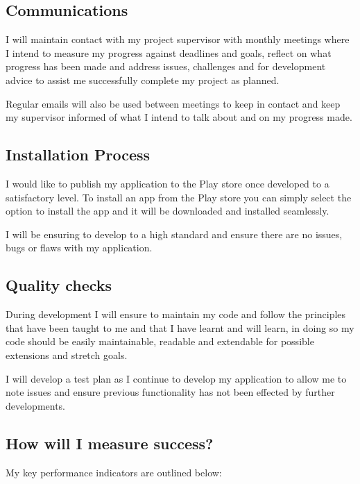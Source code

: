 \subsection{Communications}\label{communications}

I will maintain contact with my project supervisor with monthly meetings
where I intend to measure my progress against deadlines and goals,
reflect on what progress has been made and address issues, challenges
and for development advice to assist me successfully complete my project
as planned.

Regular emails will also be used between meetings to keep in contact and
keep my supervisor informed of what I intend to talk about and on my
progress made.

\subsection{Installation Process}\label{installation-process}

I would like to publish my application to the Play store once developed
to a satisfactory level. To install an app from the Play store you can
simply select the option to install the app and it will be downloaded
and installed seamlessly.

I will be ensuring to develop to a high standard and ensure there are no
issues, bugs or flaws with my application.

\subsection{Quality checks}\label{quality-checks}

During development I will ensure to maintain my code and follow the
principles that have been taught to me and that I have learnt and will
learn, in doing so my code should be easily maintainable, readable and
extendable for possible extensions and stretch goals.

I will develop a test plan as I continue to develop my application to
allow me to note issues and ensure previous functionality has not been
effected by further developments.

\subsection{How will I measure
success?}\label{how-will-i-measure-success}

My key performance indicators are outlined below:

